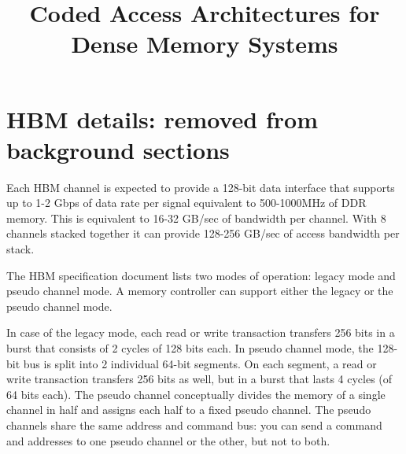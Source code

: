 \documentclass{sig-alternate}
\title{Coded Access Architectures for Dense Memory Systems}
\author{}
\begin{document}
\maketitle
\thispagestyle{firstpage}
\pagestyle{plain}


















%
\section{HBM details: removed from background sections}

Each HBM channel is expected to provide a 128-bit data interface that supports up to 1-2 Gbps of data rate per signal equivalent to 500-1000MHz of DDR memory. This is equivalent to 16-32 GB/sec of bandwidth per channel. With 8 channels stacked together it can provide 128-256 GB/sec of access bandwidth per stack. 

The HBM specification document lists two modes of operation: legacy mode and pseudo channel mode. A memory controller can support either the legacy or the pseudo channel mode. 

In case of the legacy mode, each read or write transaction transfers 256 bits in a burst that consists of 2 cycles of 128 bits each. In pseudo channel mode, the 128-bit bus is split into 2 individual 64-bit segments. On each segment, a read or write transaction transfers 256 bits as well, but in a burst that lasts 4 cycles (of 64 bits each). The pseudo channel conceptually divides the memory of a single channel in half and assigns each half to a fixed pseudo channel. The pseudo channels share the same address and command bus: you can send a command and addresses to one pseudo channel or the other, but not to both.
\end{document}
